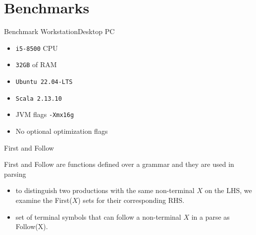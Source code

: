 \section{Benchmarks}


\begin{frame}{Benchmark Workstation}{Desktop PC}


\begin{itemize}
    \item \texttt{i5-8500} CPU
    \item \texttt{32GB} of RAM
    \item \texttt{Ubuntu 22.04-LTS}
    \item \texttt{Scala 2.13.10} 
    \item \alert{JVM flags \texttt{-Xmx16g}}
    \item  No optional optimization flags
\end{itemize}
\end{frame}



\begin{frame}[fragile=singleslide]{First and Follow}{}

\alert{First} and \alert{Follow} are functions defined over a grammar and they are used in \alert{parsing}

\begin{itemize}
    \item to distinguish two productions with the same non-terminal $X$ on the LHS, we examine the First($X$) sets for their corresponding RHS.
    \item set of terminal symbols that can follow a non-terminal $X$ in a parse as Follow(X).
\end{itemize}

\end{frame}




